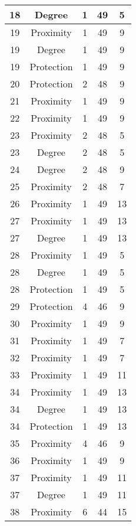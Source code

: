 \documentclass[results.tex]{subfiles}
\begin{document}
\begin{center}
\begin{tabular}{| c || c | c | c | c |}
    \hline
    18 & Degree & 1 & 49 & 5 \\ 
    \hline
    19 & Proximity & 1 & 49 & 9 \\ 
    \hline
    19 & Degree & 1 & 49 & 9 \\ 
    \hline
    19 & Protection & 1 & 49 & 9 \\ 
    \hline
    20 & Protection & 2 & 48 & 9 \\ 
    \hline
    21 & Proximity & 1 & 49 & 9 \\ 
    \hline
    22 & Proximity & 1 & 49 & 9 \\ 
    \hline
    23 & Proximity & 2 & 48 & 5 \\ 
    \hline
    23 & Degree & 2 & 48 & 5 \\ 
    \hline
    24 & Degree & 2 & 48 & 9 \\ 
    \hline
    25 & Proximity & 2 & 48 & 7 \\ 
    \hline
    26 & Proximity & 1 & 49 & 13 \\ 
    \hline
    27 & Proximity & 1 & 49 & 13 \\ 
    \hline
    27 & Degree & 1 & 49 & 13 \\ 
    \hline
    28 & Proximity & 1 & 49 & 5 \\ 
    \hline
    28 & Degree & 1 & 49 & 5 \\ 
    \hline
    28 & Protection & 1 & 49 & 5 \\ 
    \hline
    29 & Protection & 4 & 46 & 9 \\ 
    \hline
    30 & Proximity & 1 & 49 & 9 \\ 
    \hline
    31 & Proximity & 1 & 49 & 7 \\ 
    \hline
    32 & Proximity & 1 & 49 & 7 \\ 
    \hline
    33 & Proximity & 1 & 49 & 11 \\ 
    \hline
    34 & Proximity & 1 & 49 & 13 \\ 
    \hline
    34 & Degree & 1 & 49 & 13 \\ 
    \hline
    34 & Protection & 1 & 49 & 13 \\ 
    \hline
    35 & Proximity & 4 & 46 & 9 \\ 
    \hline
    36 & Proximity & 1 & 49 & 9 \\ 
    \hline
    37 & Proximity & 1 & 49 & 11 \\ 
    \hline
    37 & Degree & 1 & 49 & 11 \\ 
    \hline
    38 & Proximity & 6 & 44 & 15 \\ 

\end{tabular}
\end{center}
\end{document}
